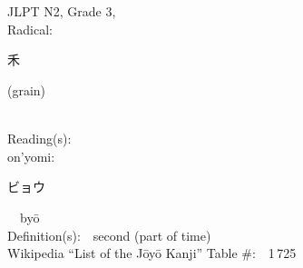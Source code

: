 \begin{multicols}{2}
\ \ \\
{\fontsize{34pt}{40pt}  }\ \ \\  %
{JLPT N2, Grade 3, \\Radical:\ \ {\begin{CJK}{UTF8}{min} 禾 \end{CJK}} (grain) } \\
Reading(s):\ \ \\
{\hspace*{1em}}on'yomi:\ \ \\
{\hspace*{2em}}{\begin{CJK}{UTF8}{min} ビョウ \end{CJK}}\ \ by\=o\ \ \\
Definition(s):\ \ second (part of time) \\
Wikipedia ``List of the J\=oy\=o Kanji'' Table \#:\ \ 1\,725 \\
\ \ \\
\end{multicols}




